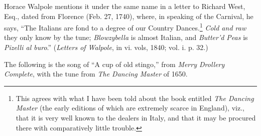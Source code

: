 Horace Walpole mentions it under the same name in a letter to Richard West,
Esq., dated from Florence (Feb. 27, 1740), where, in speaking of the Carnival,
he says, “The Italians are fond to a degree of our Country Dances.\footnote{\textit{}
This agrees with what I have been told about the book
entitled \textit{The Dancing Master} (the early editions of which
are extremely scarce in England), viz., that it is very well
known to the dealers in Italy, and that it may be procured
there with comparatively little trouble.}
 \textit{Cold and
raw} they only know by the tune; \textit{Blowzybella} is almost Italian, and \textit{Butter'd
Peas} is \textit{Pizelli al buro}.” (\textit{Letters of Walpole}, in vi. vols, 1840; vol. i. p. 32.)

The following is the song of “A cup of old stingo,” from \textit{Merry Drollery
Complete}, with the tune from \textit{The Dancing Master} of 1650.
\pagebreak



